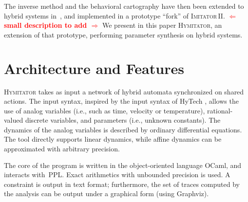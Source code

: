 \documentclass{llncs}
\newcommand{\graphviz}{Graphviz}
\newcommand{\hytech}{{\sc HyTech}}
\newcommand{\imitator}{\textsc{Imitator}}
\newcommand{\imitatordeux}{\textsc{Imitator}\,II}
\newcommand{\hymitator}{\textsc{Hymitator}}
\newcommand{\commentaire}[1]{\textcolor{red}{\textbf{$\Leftarrow$  #1 $\Rightarrow$}}}
\begin{document}
The inverse method and the behavioral cartography have then been extended to hybrid systems in~\cite{FK11}, and implemented in a prototype ``fork'' of \imitatordeux{}.
\commentaire{small description to add}
We present in this paper \hymitator{}, an extension of that prototype, performing parameter synthesis on hybrid systems.



% 
% 
% 
% 
% 

\section{Architecture and Features}

\hymitator{} takes as input a network of hybrid automata synchronized on shared actions.
The input syntax, inspired by the input syntax of \hytech{}%
, allows the use of analog variables (i.e., such as time, velocity or temperature), rational-valued discrete variables, and parameters (i.e., unknown constants). The dynamics of the analog variables is described by ordinary differential equations. The tool directly supports linear dynamics, while affine dynamics can be approximated with arbitrary precision.

The core of the program is written in the object-oriented language OCaml, and interacts with~PPL.
Exact arithmetics with unbounded precision is used.
A constraint is output in text format; furthermore, the set of traces computed by the analysis can be output under a graphical form (using \graphviz{}).
\end{document}
